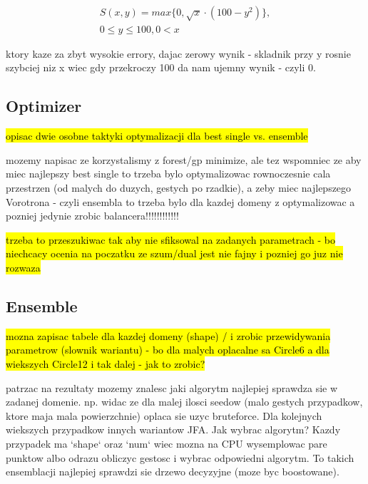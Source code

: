 \documentclass[format=acmsmall,screen,review,authordraft,nonacm]{acmart}
\begin{document}
\begin{align}
	S(x,y) = max\{0, \sqrt{x} \cdot (100-y^{2})\}, \\
0 \leq y \leq 100, 0 < x
\end{align}

ktory kaze za zbyt wysokie errory, dajac zerowy wynik - skladnik przy y rosnie
szybciej niz x wiec gdy przekroczy 100 da nam ujemny wynik - czyli 0.

\subsection{Optimizer} %

\hl{opisac dwie osobne taktyki optymalizacji dla best single vs. ensemble}

mozemy napisac ze korzystalismy z forest/gp minimize, ale tez wspomniec ze aby
miec najlepszy best single to trzeba bylo optymalizowac rownoczesnie cala
przestrzen (od malych do duzych, gestych po rzadkie), a zeby miec najlepszego
Vorotrona - czyli ensembla to trzeba bylo dla kazdej domeny z optymalizowac a
pozniej jedynie zrobic balancera!!!!!!!!!!!!

\hl{trzeba to przeszukiwac tak aby nie sfiksowal na zadanych parametrach - bo
niechcacy ocenia na poczatku ze szum/dual jest nie fajny i pozniej go juz nie
rozwaza}

\subsection{Ensemble} %

\hl{mozna zapisac tabele dla kazdej domeny (shape) / i zrobic przewidywania
parametrow (slownik wariantu) - bo dla malych oplacalne sa Circle6 a dla
wiekszych Circle12 i tak dalej - jak to zrobic?}

patrzac na rezultaty mozemy znalesc jaki algorytm najlepiej sprawdza sie w
zadanej domenie. np. widac ze dla malej ilosci seedow (malo gestych przypadkow,
ktore maja mala powierzchnie) oplaca sie uzyc bruteforce. Dla kolejnych
wiekszych przypadkow innych wariantow JFA. Jak wybrac algorytm? Kazdy przypadek ma `shape` oraz `num` wiec mozna na CPU wysemplowac
pare punktow albo odrazu obliczyc gestosc i wybrac odpowiedni algorytm.
To takich ensemblacji najlepiej sprawdzi sie drzewo decyzyjne (moze byc boostowane).

\end{document}
